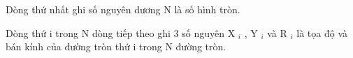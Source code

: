 Dòng thứ nhất ghi số nguyên dương N là số hình tròn.  

   Dòng thứ i trong N dòng tiếp theo ghi 3 số nguyên X   $_    i   $   , Y   $_    i   $   và R   $_    i   $   là tọa độ và bán kính của đường tròn thứ i trong N đường tròn.  

\